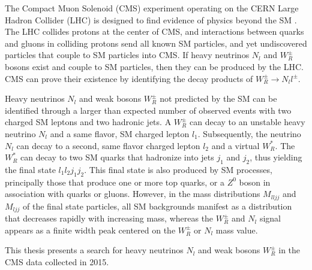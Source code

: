 The Compact Muon Solenoid (CMS) experiment operating on the CERN Large Hadron Collider (LHC) is designed to 
find evidence of physics beyond the SM \cite{cmsTDR}.  The LHC collides protons at the center of CMS, and interactions 
between quarks and gluons in colliding protons send all known SM particles, and yet undiscovered particles 
that couple to SM particles into CMS.  If heavy neutrinos $N_{l}$ and $W^{\pm}_{R}$ bosons exist and couple to SM particles, 
then they can be produced by the LHC.  CMS can prove their existence by identifying the decay products of 
$W^{\pm}_{R} \rightarrow N_{l} l^{\pm}$.

Heavy neutrinos $N_{l}$ and weak bosons $W^{\pm}_{R}$ not predicted by the SM can be identified through a larger 
than expected number of observed events with two charged SM leptons and two hadronic jets.  A $W^{\pm}_{R}$ can 
decay to an unstable heavy neutrino $N_{l}$ and a same flavor, SM charged lepton $l_{1}$.  Subsequently, the 
neutrino $N_{l}$ can decay to a second, same flavor charged lepton $l_{2}$ and a virtual $W^{*}_{R}$.  The $W^{*}_{R}$ can 
decay to two SM quarks that hadronize into jets $j_{1}$ and $j_{2}$, thus yielding the final state $l_{1}l_{2}j_{1}j_{2}$.  
This final state is also produced by SM processes, principally those that produce one or more top quarks, or 
a $Z^{0}$ boson in association with quarks or gluons.  However, in the mass distributions $M_{lljj}$ and $M_{ljj}$ 
of the final state particles, all SM backgrounds manifest as a distribution that decreases rapidly with increasing 
mass, whereas the $W^{\pm}_{R}$ and $N_{l}$ signal appears as a finite width peak centered on the $W^{\pm}_{R}$ 
or $N_{l}$ mass value.

This thesis presents a search for heavy neutrinos $N_{l}$ and weak bosons $W^{\pm}_{R}$ in the CMS data collected 
in 2015.

